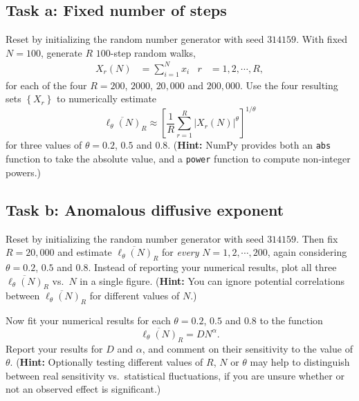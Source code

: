 \documentclass[12 pt]{article} %
\newcommand{\al}{\ensuremath{\alpha} }
\newcommand{\showmarks}[1]{\rightline{\texttt{[#1 marks]}}} %
\begin{document}
\newpage %
\subsection*{Task a: Fixed number of steps}
Reset by initializing the random number generator with seed $314159$.
With fixed $N = 100$, generate $R$ $100$-step random walks,
\begin{align*}
  X_r(N) & = \sum_{i = 1}^N x_i &
  r & = 1, 2, \cdots, R,
\end{align*}
for each of the four $R = 200$, $2000$, $20{,}000$ and $200{,}000$.
Use the four resulting sets $\left\{X_r\right\}$ to numerically estimate
\begin{equation*}
  \overline{\ell_{\theta}(N)}_R \approx \left[\frac{1}{R} \sum_{r = 1}^R \left|X_r(N)\right|^{\theta}\right]^{1 / \theta}
\end{equation*}
for three values of $\theta = 0.2$, $0.5$ and $0.8$.
(\textbf{Hint:} NumPy provides both an \texttt{abs} function to take the absolute value, and a \texttt{power} function to compute non-integer powers.)

\showmarks{12}

\subsection*{Task b: Anomalous diffusive exponent}
Reset by initializing the random number generator with seed $314159$.
Then fix $R = 20{,}000$ and estimate $\overline{\ell_{\theta}(N)}_R$ for \textit{every} $N = 1, 2, \cdots, 200$, again considering $\theta = 0.2$, $0.5$ and $0.8$.
Instead of reporting your numerical results, plot all three $\overline{\ell_{\theta}(N)}_R$ vs.\ $N$ in a single figure.
(\textbf{Hint:} You can ignore potential correlations between $\overline{\ell_{\theta}(N)}_R$ for different values of $N$.)

\showmarks{8}

Now fit your numerical results for each $\theta = 0.2$, $0.5$ and $0.8$ to the function
\begin{equation*}
  \overline{\ell_{\theta}(N)}_R = D N^{\al}.
\end{equation*}
Report your results for $D$ and $\al$, and comment on their sensitivity to the value of $\theta$.
(\textbf{Hint:} Optionally testing different values of $R$, $N$ or $\theta$ may help to distinguish between real sensitivity vs.\ statistical fluctuations, if you are unsure whether or not an observed effect is significant.)

\showmarks{10}



\end{document}
